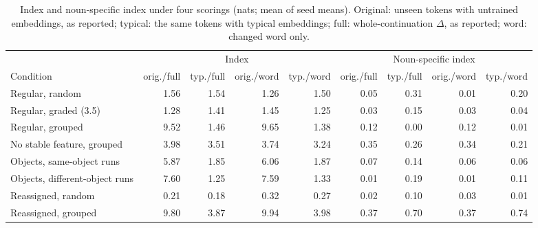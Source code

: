 \begin{table}[!htbp]
\centering\footnotesize\setlength{\tabcolsep}{4pt}
\caption{Index and noun-specific index under four scorings (nats; mean of seed means). Original: unseen tokens with untrained embeddings, as reported; typical: the same tokens with typical embeddings; full: whole-continuation $\Delta$, as reported; word: changed word only.}
\label{tab:L1}
\begin{tabular}{@{}lrrrrrrrr@{}}
\toprule
 & \multicolumn{4}{c}{Index} & \multicolumn{4}{c}{Noun-specific index} \\
\cmidrule(lr){2-5}\cmidrule(l){6-9}
Condition & orig./full & typ./full & orig./word & typ./word & orig./full & typ./full & orig./word & typ./word \\
\midrule
Regular, random & \textminus{}1.56 & \textminus{}1.54 & \textminus{}1.26 & \textminus{}1.50 & \textminus{}0.05 & \textminus{}0.31 & 0.01 & \textminus{}0.20 \\
Regular, graded (3.5) & 1.28 & \textminus{}1.41 & 1.45 & \textminus{}1.25 & \textminus{}0.03 & \textminus{}0.15 & 0.03 & \textminus{}0.04 \\
Regular, grouped & 9.52 & 1.46 & 9.65 & 1.38 & 0.12 & 0.00 & 0.12 & 0.01 \\
No stable feature, grouped & \textminus{}3.98 & \textminus{}3.51 & \textminus{}3.74 & \textminus{}3.24 & \textminus{}0.35 & \textminus{}0.26 & \textminus{}0.34 & \textminus{}0.21 \\
Objects, same-object runs & 5.87 & \textminus{}1.85 & 6.06 & \textminus{}1.87 & \textminus{}0.07 & 0.14 & \textminus{}0.06 & 0.06 \\
Objects, different-object runs & 7.60 & \textminus{}1.25 & 7.59 & \textminus{}1.33 & \textminus{}0.01 & 0.19 & \textminus{}0.01 & 0.11 \\
Reassigned, random & 0.21 & 0.18 & 0.32 & 0.27 & 0.02 & \textminus{}0.10 & 0.03 & \textminus{}0.01 \\
Reassigned, grouped & 9.80 & 3.87 & 9.94 & 3.98 & 0.37 & 0.70 & 0.37 & 0.74 \\
\bottomrule
\end{tabular}
\end{table}

